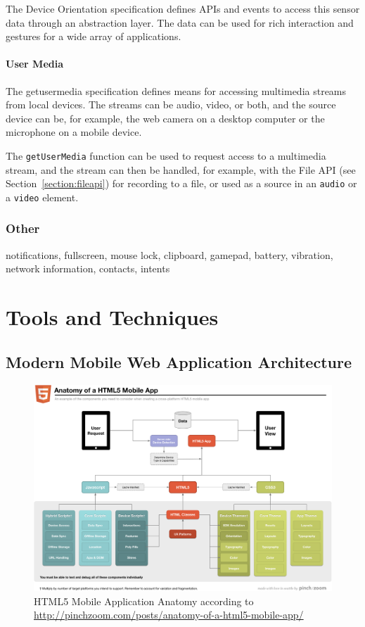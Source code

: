 The Device Orientation specification \cite{DeviceOrientation} defines
APIs and events to access this sensor data through an abstraction
layer. The data can be used for rich interaction and gestures for a
wide array of applications.

\subsubsection{User Media}
\label{section:getusermedia}

The getusermedia specification \cite{getusermedia} defines means for
accessing multimedia streams from local devices. The streams can be
audio, video, or both, and the source device can be, for example, the
web camera on a desktop computer or the microphone on a mobile device.

The \texttt{getUserMedia} function can be used to request access to a
multimedia stream, and the stream can then be handled, for example,
with the File API (see Section~\ref{section:fileapi}) for recording to
a file, or used as a source in an \texttt{audio} or a \texttt{video}
element.

\subsection{Other}

notifications, fullscreen, mouse lock, clipboard, gamepad, battery,
vibration, network information, contacts, intents

\chapter{Tools and Techniques}
\label{chapter:tools-and-techniques}

\section{Modern Mobile Web Application Architecture}
\label{section:modern-mobile-web}

\begin{figure}[ht]
  \includegraphics[width=\textwidth]{images/anatomy-of-a-html5-mobile-app.png}
  \caption{HTML5 Mobile Application Anatomy according to
    \url{http://pinchzoom.com/posts/anatomy-of-a-html5-mobile-app/}}
  \label{figure:anatomy-of-a-html5-mobile-app.png}
\end{figure}

